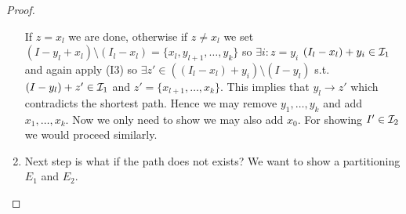 \begin{proof}
\begin{enumerate}
		If $z = x_l$ we are done, otherwise if $z \neq x_l$ we set $(I - y_l + x_l) \setminus (I_l - x_l) = \{x_l, y_{l+1}, \dots, y_k\}$ so $\exists i : z = y_i$ $(I_l - x_l) + y_i \in \mathcal{I}_1$ and again apply (I3) so $\exists z' \in ((I_l - x_l) + y_i) \setminus (I - y_l)$ s.t. $(I - y_l) + z' \in \mathcal{I}_1$ and $z' = \{x_{l+1}, \dots, x_k\}$. This implies that $y_l \to z'$ which contradicts the shortest path. Hence we may remove $y_1, \dots, y_k$ and add $x_1, \dots, x_k$. Now we only need to show we may also add $x_0$. For showing $I' \in \mathcal{I}_2$ we would proceed similarly.
		
		\item Next step is what if the path does not exists? We want to show a partitioning $E_1$ and $E_2$.
	\end{enumerate}
\end{proof}